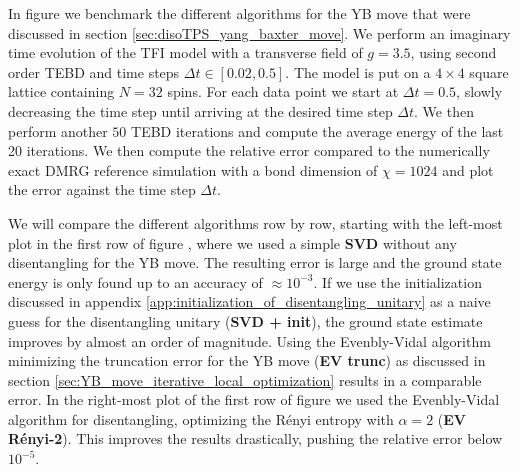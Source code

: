 In figure  we benchmark the different algorithms for the YB move that were discussed in section \ref{sec:disoTPS_yang_baxter_move}. We perform an imaginary time evolution of the TFI model with a transverse field of $g = 3.5$, using second order TEBD and time steps $\Delta t \in \left[0.02, 0.5\right]$. The model is put on a $4\times4$ square lattice containing $N = 32$ spins. For each data point we start at $\Delta t = 0.5$, slowly decreasing the time step until arriving at the desired time step $\Delta t$. We then perform another $50$ TEBD iterations and compute the average energy of the last 20 iterations. We then compute the relative error compared to the numerically exact DMRG reference simulation with a bond dimension of $\chi = 1024$ and plot the error against the time step $\Delta t$. \par
%

%
We will compare the different algorithms row by row, starting with the left-most plot in the first row of figure , where we used a simple \textbf{SVD} without any disentangling for the YB move. The resulting error is large and the ground state energy is only found up to an accuracy of $\approx10^{-3}$. If we use the initialization discussed in appendix \ref{app:initialization_of_disentangling_unitary} as a naive guess for the disentangling unitary (\textbf{SVD + init}), the ground state estimate improves by almost an order of magnitude. Using the Evenbly-Vidal algorithm minimizing the truncation error for the YB move (\textbf{EV trunc}) as discussed in section \ref{sec:YB_move_iterative_local_optimization} results in a comparable error. In the right-most plot of the first row of figure  we used the Evenbly-Vidal algorithm for disentangling, optimizing the Rényi entropy with $\alpha = 2$ (\textbf{EV Rényi-2}). This improves the results drastically, pushing the relative error below $10^{-5}$. \par
